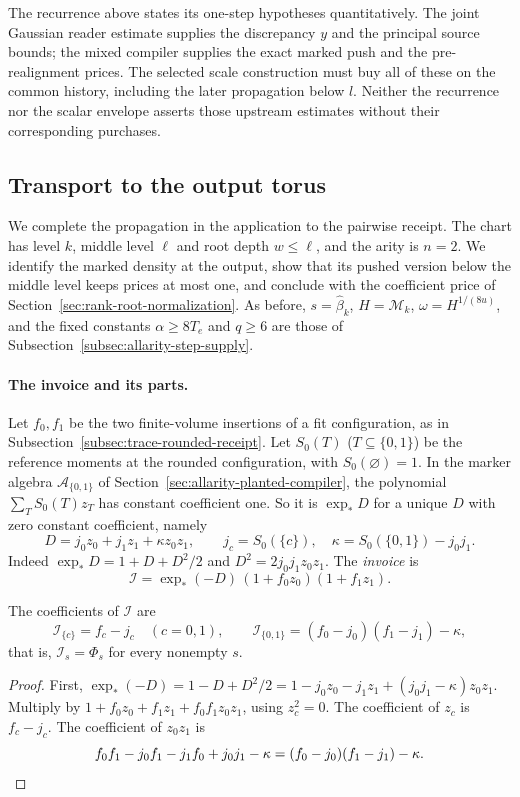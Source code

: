 The recurrence above states its one-step hypotheses quantitatively.
The joint Gaussian reader estimate supplies the discrepancy $y$ and
the principal source bounds; the mixed compiler supplies the exact
marked push and the pre-realignment prices. The selected scale
construction must buy all of these on the common history, including
the later propagation below $l$. Neither the recurrence nor the
scalar envelope asserts those upstream estimates without their
corresponding purchases.

\subsection{Transport to the output torus}
\label{subsec:allarity-output-transport}

We complete the propagation in the application to the pairwise receipt.
The chart has level $k$, middle level $\ell$ and root depth $w\le\ell$, and
the arity is $n=2$. We identify the marked density at the output, show
that its pushed version below the middle level keeps prices at most one,
and conclude with the coefficient price of
Section~\ref{sec:rank-root-normalization}. As before, $s=\widehat\beta_k$,
$H=\mathcal M_k$, $\omega=H^{1/(8u)}$, and the fixed constants
$\alpha\ge8T_e$ and $q\ge6$ are those of
Subsection~\ref{subsec:allarity-step-supply}.

\paragraph{The invoice and its parts.}
Let $f_0,f_1$ be the two finite-volume insertions of a fit configuration,
as in Subsection~\ref{subsec:trace-rounded-receipt}. Let $S_0(T)$
($T\subseteq\{0,1\}$) be the reference moments at the rounded
configuration, with $S_0(\varnothing)=1$. In the marker algebra
$\mathscr A_{\{0,1\}}$ of Section~\ref{sec:allarity-planted-compiler},
the polynomial $\sum_TS_0(T)z_T$ has constant coefficient one. So it is
$\exp_*D$ for a unique $D$ with zero constant coefficient, namely
\[
 D=j_0z_0+j_1z_1+\kappa z_0z_1,\qquad
 j_c=S_0(\{c\}),\quad\kappa=S_0(\{0,1\})-j_0j_1 .
\]
Indeed $\exp_*D=1+D+D^2/2$ and $D^2=2j_0j_1z_0z_1$. The \emph{invoice} is
\[
 \mathcal I=\exp_*(-D)\,(1+f_0z_0)(1+f_1z_1).
\]

\begin{lemma}\label{lem:allarity-invoice-parts}
The coefficients of $\mathcal I$ are
\[
 \mathcal I_{\{c\}}=f_c-j_c\quad(c=0,1),\qquad
 \mathcal I_{\{0,1\}}=(f_0-j_0)(f_1-j_1)-\kappa ,
\]
that is, $\mathcal I_s=\Phi_s$ for every nonempty $s$.
\end{lemma}
\begin{proof}
First,
$\exp_*(-D)=1-D+D^2/2=1-j_0z_0-j_1z_1+(j_0j_1-\kappa)z_0z_1$.
Multiply by $1+f_0z_0+f_1z_1+f_0f_1z_0z_1$, using $z_c^2=0$. The
coefficient of $z_c$ is $f_c-j_c$. The coefficient of $z_0z_1$ is
\[
 f_0f_1-j_0f_1-j_1f_0+j_0j_1-\kappa
 =(f_0-j_0)(f_1-j_1)-\kappa .\qedhere
\]
\end{proof}

